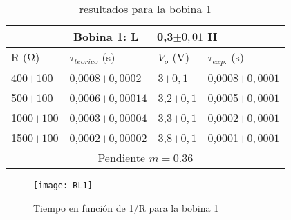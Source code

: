 \documentclass[a4paper,12pt,spanish]{article}
\begin{document}
\begin{table}[H]
	\centering
	\begin{tabular}{|llll|}
		\hline
		\multicolumn{4}{|c|}{Bobina 1: L = 0,3$\pm0,01$ H}                                                                     \\ \hline
\multicolumn{1}{|l|}{R ($\si{\ohm}$)}    & \multicolumn{1}{l|}{$\tau_{teorico}$ (s)} & \multicolumn{1}{l|}{$V_o$ (V)} & $\tau_{exp.}$ (s) \\ \hline
		\multicolumn{1}{|l|}{400$\pm100$}  & \multicolumn{1}{l|}{0,0008$\pm 0,0002$}     & \multicolumn{1}{l|}{3$\pm 0,1$}     & 0,0008$\pm 0,0001$        \\ \hline
		\multicolumn{1}{|l|}{500$\pm100$}  & \multicolumn{1}{l|}{0,0006$\pm 0,00014$}      & \multicolumn{1}{l|}{3,2$\pm 0,1$}   & 0,0005$\pm 0,0001$           \\ \hline
		\multicolumn{1}{|l|}{1000$\pm100$} & \multicolumn{1}{l|}{0,0003$\pm 0,00004$}      & \multicolumn{1}{l|}{3,3$\pm 0,1$}   & 0,0002$\pm 0,0001$           \\ \hline
		\multicolumn{1}{|l|}{1500$\pm100$} & \multicolumn{1}{l|}{0,0002$\pm 0,00002$}      & \multicolumn{1}{l|}{3,8$\pm 0,1$}   & 0,0001$\pm 0,0001$           \\ \hline
		\multicolumn{4}{|c|}{Pendiente $ m = 0.36$}                                               \\ \hline
	\end{tabular}
	\caption{resultados para la bobina 1}
	\label{tab:my-table}
\end{table}



\begin{figure}[H]
	\centering
	\texttt{[image: RL1]}
	\caption{Tiempo en función de 1/R para la bobina 1}
	\label{fig:rl1}
\end{figure}
\end{document}
